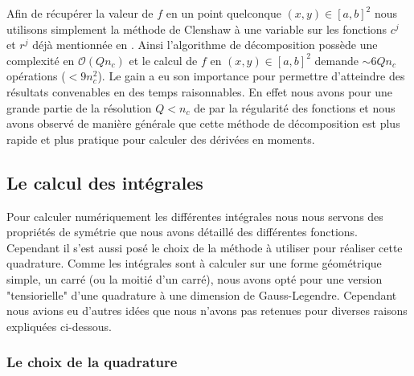 \documentclass[10.5pt]{article}
\begin{document}
\begin{multicols}{2}
Afin de récupérer la valeur de $f$ en un point quelconque $(x,y) \in [a,b]^2 $ nous utilisons simplement la méthode de Clenshaw à une variable sur les fonctions $c^j$ et $r^j$ déjà mentionnée en . Ainsi l'algorithme de décomposition possède une complexité en $\mathcal{O}(Q n_c)$ et le calcul de $f$ en $(x,y) \in [a,b]^2$ demande $\sim 6Qn_c$ opérations ($< 9n_c^2$). Le gain a eu son importance pour permettre d'atteindre des résultats convenables en des temps raisonnables. En effet nous avons pour une grande partie de la résolution $Q < n_c$ de par la régularité des fonctions et nous avons observé de manière générale que cette méthode de décomposition est plus rapide et plus pratique pour calculer des dérivées en moments. \\



\subsection{Le calcul des intégrales} 

Pour calculer numériquement les différentes intégrales nous nous servons des propriétés de symétrie que nous avons détaillé des différentes fonctions. Cependant il s'est aussi posé le choix de la méthode à utiliser pour réaliser cette quadrature. Comme les intégrales sont à calculer sur une forme géométrique simple, un carré (ou la moitié d'un carré), nous avons opté pour une version "tensiorielle" d'une quadrature à une dimension de Gauss-Legendre. Cependant nous avions eu d'autres idées que nous n'avons pas retenues pour diverses raisons expliquées ci-dessous.


\subsubsection{Le choix de la quadrature}


\end{multicols}
\end{document}
